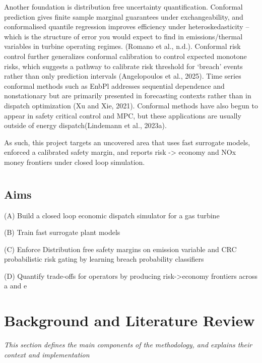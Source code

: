 \documentclass[11pt]{article}
\begin{document}
Another foundation is distribution free uncertainty quantification.
Conformal prediction gives finite sample marginal guarantees under
exchangeability, and conformalised quantile regression improves
efficiency under heteroskedasticity -- which is the structure of error
you would expect to find in emissions/thermal variables in turbine
operating regimes. (Romano et al., n.d.). Conformal risk control further
generalizes conformal calibration to control expected monotone risks,
which suggests a pathway to calibrate risk threshold for `breach' events
rather than only prediction intervals (Angelopoulos et al., 2025). Time
series conformal methods such as EnbPl addresses sequential dependence
and nonstationary but are primarily presented in forecasting contexts
rather than in dispatch optimization (Xu and Xie, 2021). Conformal
methods have also begun to appear in safety critical control and MPC,
but these applications are usually outside of energy dispatch(Lindemann
et al., 2023a).

As such, this project targets an uncovered area that uses fast surrogate
models, enforced a calibrated safety margin, and reports risk
-\textgreater{} economy and NOx money frontiers under closed loop
simulation.

\section{}\label{section-2}

\subsection{Aims}\label{aims}

(A) Build a closed loop economic dispatch simulator for a gas turbine

(B) Train fast surrogate plant models

(C) Enforce Distribution free safety margins on emission variable and
CRC probabilistic risk gating by learning breach probability classifiers

(D) Quantify trade-offs for operators by producing
risk-\textgreater economy frontiers across a and e

\section{Background and Literature
Review}\label{background-and-literature-review}

\emph{This section defines the main components of the methodology, and
explains their context and implementation}
\end{document}
